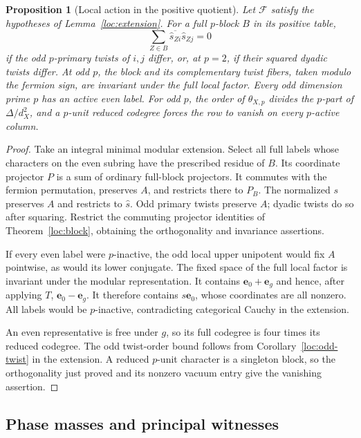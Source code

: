 \documentclass[11pt,a4paper]{article}
\numberwithin{equation}{section}
\newtheorem{proposition}[theorem]{Proposition}
\begin{document}
\begin{proposition}[Local action in the positive quotient]\label{loc:reduced}
Let $\mathcal F$ satisfy the hypotheses of Lemma~\ref{loc:extension}.
For a full $p$-block $B$ in its positive table,
\[
 \sum_{Z\in B}\overline{\widehat s_{Zi}}\widehat s_{Zj}=0
\]
if the odd $p$-primary twists of $i,j$ differ, or, at $p=2$, if
their squared dyadic twists differ. At odd $p$, the block and its
complementary twist fibers, taken modulo the fermion sign, are
invariant under the full local factor. Every odd dimension prime
$p$ has an active even label. For odd $p$, the order of
$\theta_{X,p}$ divides the $p$-part of $\Delta/d_X^2$, and a
$p$-unit reduced codegree forces the row to vanish on every
$p$-active column.
\end{proposition}
\begin{proof}
Take an integral minimal modular extension. Select all full labels whose
characters on the even subring have the prescribed residue of
$B$. Its coordinate projector $P$ is a sum of ordinary full-block
projectors. It commutes with the fermion permutation, preserves
$A$, and restricts there to $P_B$. The normalized $s$ preserves
$A$ and restricts to $\widehat s$. Odd primary twists preserve
$A$; dyadic twists do so after squaring. Restrict the commuting
projector identities of Theorem~\ref{loc:block}, obtaining the
orthogonality and invariance assertions.

If every even label were $p$-inactive, the odd local upper
unipotent would fix $A$ pointwise, as would its lower conjugate.
The fixed space of the full local factor is invariant under the
modular representation. It contains
$\mathbf e_0+\mathbf e_g$ and hence, after applying $T$,
$\mathbf e_0-\mathbf e_g$. It therefore contains $s\mathbf e_0$,
whose coordinates are all nonzero. All labels would be
$p$-inactive, contradicting categorical Cauchy in the extension.

An even representative is free under $g$, so its full codegree is
four times its reduced codegree. The odd twist-order bound follows from
Corollary~\ref{loc:odd-twist} in the extension.
A reduced $p$-unit character is a singleton block, so the
orthogonality just proved and its nonzero vacuum entry give the
vanishing assertion.
\end{proof}

\subsection{Phase masses and principal witnesses}
\end{document}
